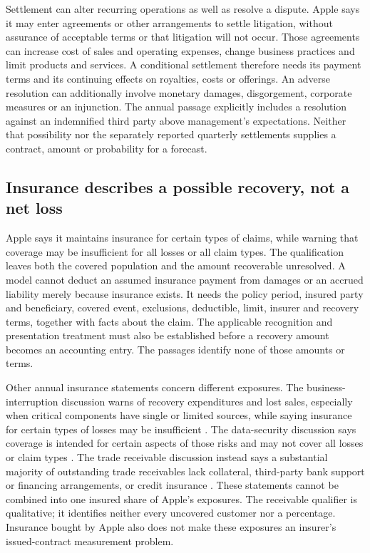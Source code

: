 Settlement can alter recurring operations as well as resolve a dispute. Apple
says it may enter agreements or other arrangements to settle litigation,
without assurance of acceptable terms or that litigation will not occur.
Those agreements can increase cost of sales and operating expenses, change
business practices and limit products and services. A conditional settlement
therefore needs its payment terms and its continuing effects on royalties,
costs or offerings. An adverse resolution can additionally involve monetary
damages, disgorgement, corporate measures or an injunction. The annual passage
explicitly includes a resolution against an indemnified third party above
management's expectations. Neither that possibility nor the separately reported
quarterly settlements supplies a contract, amount or probability for a forecast.

\subsection{Insurance describes a possible recovery, not a net loss}

Apple says it maintains insurance for certain types of claims, while warning
that coverage may be insufficient for all losses or all claim types. The
qualification leaves both the covered population and the amount recoverable
unresolved. A model cannot deduct an assumed insurance payment from damages
or an accrued liability merely because insurance exists. It needs the policy
period, insured party and beneficiary, covered event, exclusions, deductible,
limit, insurer and recovery terms, together with facts about the claim. The
applicable recognition and presentation treatment must also be established
before a recovery amount becomes an accounting entry. The passages identify
none of those amounts or terms.

Other annual insurance statements concern different exposures. The
business-interruption discussion warns of recovery expenditures and lost sales,
especially when critical components have single or limited sources, while
saying insurance for certain types of losses may be insufficient
\citep[Risk Factors, printed p.~6]{apple2024}. The data-security discussion says
coverage is intended for certain aspects of those risks and may not cover all
losses or claim types \citep[Risk Factors, printed p.~12]{apple2024}. The trade
receivable discussion instead says a substantial majority of outstanding trade
receivables lack collateral, third-party bank support or financing arrangements,
or credit insurance \citep[Risk Factors, printed p.~16]{apple2024}. These
statements cannot be combined into one insured share of Apple's exposures.
The receivable qualifier is qualitative; it identifies neither every uncovered
customer nor a percentage. Insurance bought by Apple also does not make these
exposures an insurer's issued-contract measurement problem.

